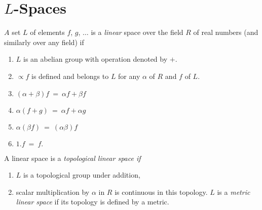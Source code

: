 \section{\texorpdfstring{$L$}{L}-Spaces}\label{chap1:sec16}

$A$ set $L$ of elements $f$, $g$, $\ldots$ is a \textit{linear} space over the 
field $R$ of real numbers (and similarly over any field) if 
\begin{enumerate}[(1)]
\item $L$ is an abelian group with operation denoted by $+$.
\item $\propto f$ is defined and belongs to $L$ for any $\alpha$ of
  $R$ and $f$ of $L$. 
\item $(\alpha + \beta)f ~ = ~ \alpha f + \beta f$
\item $\alpha (f + g) ~ =~ \alpha f + \alpha g$
\item $\alpha (\beta f)~=~ (\alpha \beta) f$
\item $1. f ~ = ~ f.$
\end{enumerate} 
A linear space is a \textit{topological linear space if}
\begin{enumerate}[(1)]
\item $L$ is a topological group under addition,
\item scalar multiplication by $\alpha$ in $R$ is continuous in this topology.
  $L$ is a \textit{metric linear space} if its topology is defined by a metric.
\end{enumerate}

